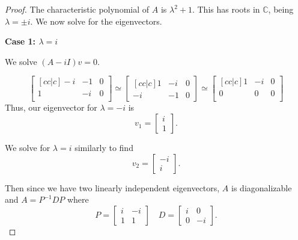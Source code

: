 \documentclass{article}
\begin{document}
\begin{proof}
    The characteristic polynomial of $A$ is $\lambda^2 + 1$. This has roots in $\mathbb{C}$, being  $\lambda = \pm i$. We now solve for the eigenvectors.

    \textbf{Case 1: $\lambda = i$} 

    We solve $(A - iI)v = 0.$ 

        \[
            \begin{bmatrix}[cc | c]
                -i & -1 &  0\\ 
                1 & -i & 0 \\
            \end{bmatrix} 
            \simeq 
            \begin{bmatrix}[c c | c]
                1 & -i & 0 \\ 
                -i & -1 & 0
            \end{bmatrix} 
            \simeq 
            \begin{bmatrix}[c c | c]
                1 & -i & 0 \\ 
                0 & 0 & 0 \\
            \end{bmatrix} 
        \] Thus, our eigenvector for $\lambda = -i$ is  \[
        v_1 = \begin{bmatrix} 
            i \\ 
            1
        \end{bmatrix}. 
        \] 

        We solve for $\lambda = i$ similarly to find  \[
        v_2 = \begin{bmatrix} -i \\ i  \end{bmatrix}.
        \] 

        Then since we have two linearly independent eigenvectors, $A$ is diagonalizable and  $A = P^{-1} D P $ where  \[
            P = \begin{bmatrix} i & -i \\ 1 & 1 \end{bmatrix} \quad D = \begin{bmatrix} i & 0 \\ 0 & -i \end{bmatrix}.
        \] 
    
\end{proof}
\end{document}
